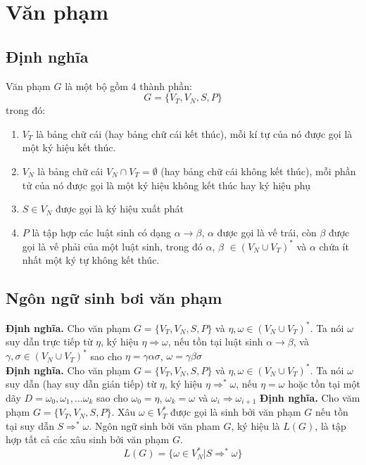 \documentclass[14pt]{extreport}
\begin{document}
\section{Văn phạm}
\subsection{Định nghĩa}
Văn phạm $G$ là một bộ gồm 4 thành phần:
$$G = \{ V_T, V_N, S, P \}$$
trong đó:\\
\begin{enumerate}
\item $V_T$ là bảng chữ cái (hay bảng chữ cái kết thúc), mỗi kí tự của nó được gọi là một ký hiệu kết thúc.
\item $V_N$ là bảng chữ cái $V_N \cap V_T = \emptyset$ (hay bảng chữ cái không kết thúc), mỗi phần tử của nó được gọi là một ký hiệu không kết thúc hay ký hiệu phụ
\item $S \in V_N$ được gọi là ký hiệu xuất phát
\item $P$ là tập hợp các luật sinh có dạng $\alpha \rightarrow \beta$, $\alpha$ được gọi là vế trái, còn $\beta$ được gọi là vế phải của một luật sinh, trong đó $\alpha$, $\beta$ $\in (V_N \cup V_T)^*$ và $\alpha$ chứa ít nhất một ký tự không kết thúc.
\end{enumerate}
\subsection{Ngôn ngữ sinh bơi văn phạm}
\textbf{Định nghĩa.} Cho văn phạm $G = \{ V_T, V_N, S, P \}$ và $\eta , \omega \in (V_N \cup V_T)^*$. Ta nói $\omega$ suy dẫn trực tiếp từ $\eta$, ký hiệu $\eta \Rightarrow \omega$, nếu tồn tại luật sinh $\alpha \rightarrow \beta$, và $\gamma , \sigma \in (V_N \cup V_T)^*$ sao cho $\eta = \gamma \alpha \sigma$, $\omega = \gamma \beta \sigma$ \\
\textbf{Định nghĩa.} Cho văn phạm $G = \{ V_T, V_N, S, P \}$ và $\eta , \omega \in (V_N \cup V_T)^*$. Ta nói $\omega$ suy dẫn (hay suy dẫn gián tiếp) từ $\eta$, ký hiệu $\eta \Rightarrow^* \omega$, nếu $\eta = \omega$ hoặc tồn tại một dãy $D = \omega_0 , \omega_1 , ... \omega_k$ sao cho $\omega_0 = \eta$, $\omega_k = \omega$ và $\omega_i \Rightarrow \omega_{i+1}$
\textbf{Định nghĩa.} Cho văm phạm  $G = \{ V_T, V_N, S, P \}$. Xâu $\omega \in V_T^*$ được gọi là sinh bởi văn phạm $G$ nếu tồn tại suy dẫn $S \Rightarrow^* \omega$. Ngôn ngữ sinh bởi văn pham $G$, ký hiệu là $L(G)$, là tập hợp tất cả các xâu sinh bởi văn phạm $G$.
$$L(G) = \{ \omega \in V_N^* | S \Rightarrow^* \omega \}$$
\end{document}
